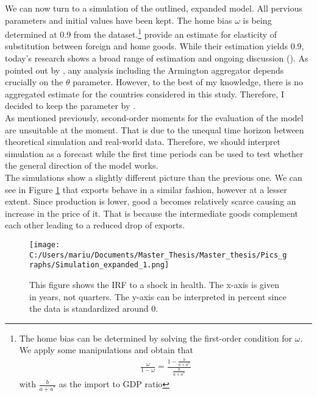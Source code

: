 \documentclass{article}
\begin{document}
We can now turn to a simulation of the outlined, expanded model. All pervious parameters and initial values have been kept. The home bias $\omega$ is being determined at 0.9 from the dataset.\footnote{The home bias can be determined by solving the first-order condition for $\omega$. We apply some manipulations and obtain that \begin{align}
\frac{\omega}{1-\omega} = \frac{1 - \frac{b}{a + a^*}}{\frac{b}{a + a^*}}
\end{align}
with $\frac{b}{a + a^*}$ as the import to GDP ratio}
\cite{heathcote2002financial} provide an estimate for elasticity of substitution between foreign and home goods. While their estimation yields 0.9, today's research shows a broad range of estimation and ongoing discussion (\cite{feenstra2018search}). As pointed out by \cite{feenstra2018search}, any analysis including the Armington aggregator depends crucially on the $\theta$ parameter. However, to the best of my knowledge, there is no aggregated estimate for the countries considered in this study. Therefore, I decided to keep the parameter by  
\cite{heathcote2002financial}.\\
As mentioned previously, second-order moments for the evaluation of the model are unsuitable at the moment. That is due to the unequal time horizon between theoretical simulation and real-world data. Therefore, we should interpret simulation as a forecast while the first time periods can be used to test whether the general direction of the model works. \\
The simulations show a slightly different picture than the previous one. We can see in Figure \ref{Expanded Simulation} that exports behave in a similar fashion, however at a lesser extent. Since production is lower, good a becomes relatively scarce causing an increase in the price of it. That is because the intermediate goods complement each other leading to a reduced drop of exports.
\begin{figure}[!ht]
\begin{center} 
\begin{minipage}[t]{0.8\textwidth}
\texttt{[image: C:/Users/mariu/Documents/Master\_Thesis/Master\_thesis/Pics\_graphs/Simulation\_expanded\_1.png]}\\
\caption{This figure shows the IRF to a shock in health. The x-axis is given in years, not quarters. The y-axis can be interpreted in percent since the data is standardized around 0.\label{Expanded Simulation}}
\end{minipage}
\end{center}
\end{figure}
\end{document}
